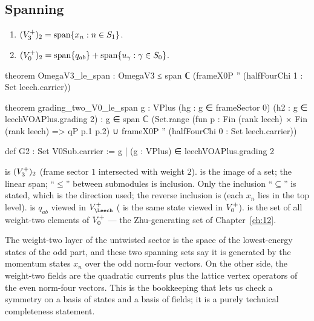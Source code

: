 \subsection{Spanning}
\begin{proposition}\label{ch13:prop:span}
\begin{enumerate}[label=(\alph*)]
\item $(V_3^{+})_2=\operatorname{span}\{x_n : n\in S_1\}$.
\item $(V_0^{+})_2=\operatorname{span}\{q_{ab}\}+\operatorname{span}\{u_\gamma:\gamma\in S_0\}$.
\end{enumerate}
\end{proposition}
\begin{leancode}
theorem OmegaV3_le_span : OmegaV3 ≤ span ℂ (frameX0P '' (halfFourChi 1 : Set leech.carrier))

theorem grading_two_V0_le_span {g : VPlus} (hg : g ∈ frameSector 0) (h2 : g ∈ leechVOAPlus.grading 2) :
    g ∈ span ℂ (Set.range (fun p : Fin (rank leech) × Fin (rank leech) => qP p.1 p.2)
      ∪ frameX0P '' (halfFourChi 0 : Set leech.carrier))

def G2 : Set V0Sub.carrier := {g | (g : VPlus) ∈ leechVOAPlus.grading 2}
\end{leancode}
\begin{dictionary}
 is $(V_3^{+})_2$ (frame sector $1$ intersected with weight $2$).  is
the image of a set;  the linear span; ``$\le$'' between submodules is inclusion. Only the
inclusion ``$\subseteq$'' is stated, which is the direction used; the reverse inclusion is
 (each $x_n$ lies in the top level).  is $q_{ab}$ viewed in
$V_\Leech^+$ ( is the same state viewed in $V_0^{+}$).  is the set of all weight-two
elements of $V_0^{+}$ --- the Zhu-generating set of Chapter~\ref{ch:12}.
\end{dictionary}
\begin{physics}
The weight-two layer of the untwisted sector is the space of the lowest-energy states of the odd part, and these two spanning sets say it is generated by the momentum states $x_n$ over the odd norm-four vectors. On the other side, the weight-two fields are the quadratic currents plus the lattice vertex operators of the even norm-four vectors. This is the bookkeeping that lets us check a symmetry on a basis of states and a basis of fields; it is a purely technical completeness statement.
\end{physics}
